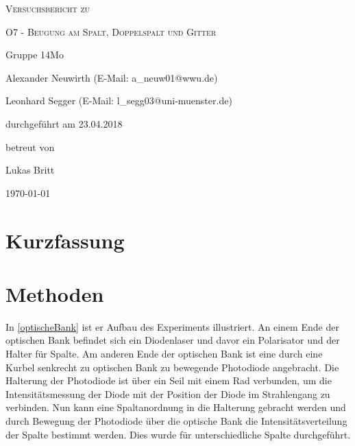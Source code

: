 \documentclass[
	a4paper,
	12pt,
	pagesize,
	ngerman
]{scrartcl}
\begin{document}
	
	\begin{titlepage}
		\centering
		{\scshape\LARGE Versuchsbericht zu \par}
		\vspace{1cm}
		{\scshape\huge O7 - Beugung am Spalt, Doppelspalt und Gitter \par} %
		\vspace{2.5cm}
		{\LARGE Gruppe 14Mo \par}
		\vspace{0.5cm}
		
		{\large Alexander Neuwirth (E-Mail: a\_neuw01@wwu.de) \par}
		{\large Leonhard Segger (E-Mail: l\_segg03@uni-muenster.de) \par}
		\vfill
		
		durchgeführt am 23.04.2018\par %
		betreut von\par
		{\large Lukas Britt} %
		
		\vfill
		
		{\large \today\par}
	\end{titlepage}
	\tableofcontents
	\newpage

	\section{Kurzfassung}
	
	\section{Methoden}
	In \cref{optischeBank} ist er Aufbau des Experiments illustriert.
	An einem Ende der optischen Bank befindet sich ein Diodenlaser und davor ein Polarisator und der Halter für Spalte.
	Am anderen Ende der optischen Bank ist eine durch eine Kurbel senkrecht zu optischen Bank zu bewegende Photodiode angebracht.
	Die Halterung der Photodiode ist über ein Seil mit einem Rad verbunden, um die Intensitätsmessung der Diode mit der Position der Diode im Strahlengang zu verbinden.
	Nun kann eine Spaltanordnung in die Halterung gebracht werden und durch Bewegung der Photodiode über die optische Bank die Intensitätsverteilung der Spalte bestimmt werden.
	Dies wurde für unterschiedliche Spalte durchgeführt. %
	
\end{document}
